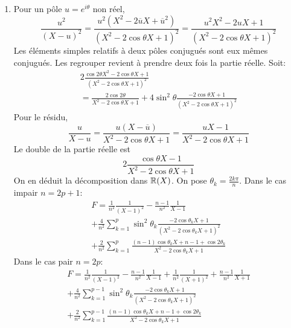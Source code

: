 \begin{enumerate}
\begin{enumerate}
 \item Pour un pôle $u=e^{i\theta}$ non réel, 
\begin{displaymath}
 \frac{u^2}{(X-u)^2}= \frac{u^2(X^2-2\overline{u}X+\overline{u}^2)}{(X^2-2\cos\theta X +1)^2}
=\frac{u^2X^2-2uX+1}{(X^2-2\cos\theta X +1)^2}
\end{displaymath}
Les éléments simples relatifs à deux pôles conjugués sont eux mêmes conjugués. Les regrouper revient à prendre deux fois la partie réelle. Soit:
\begin{multline*}
 2\frac{\cos2\theta X^2 -2\cos\theta X +1}{(X^2-2\cos\theta X +1)^2}\\
= \frac{2\cos 2\theta }{X^2-2\cos\theta X +1} +4\sin^2\theta\frac{-2\cos \theta X +1}{(X^2-2\cos\theta X +1)^2}
\end{multline*}
Pour le résidu,
\begin{displaymath}
 \frac{u}{X-u}=\frac{u(X-\overline{u})}{X^2-2\cos\theta X +1}=\frac{uX-1}{X^2-2\cos\theta X +1}
\end{displaymath}
Le double de la partie réelle est 
\begin{displaymath}
 2\frac{\cos \theta X-1}{X^2-2\cos\theta X +1}
\end{displaymath}
On en déduit la décomposition dans $\mathbb{R}(X)$. On pose $\theta_k= \frac{2k\pi}{n}$.\newline
Dans le cas impair $n=2p+1$:
\begin{multline*}
 F=\frac{1}{n^2}\frac{1}{(X-1)^2}-\frac{n-1}{n^2}\frac{1}{X-1}\\
+\frac{4}{n^2}\sum_{k=1}^p\sin^2\theta_k\frac{-2\cos \theta_k X +1}{(X^2-2\cos\theta_k X +1)^2}\\
+\frac{2}{n^2}\sum_{k=1}^p\frac{(n-1)\cos \theta_k X +n-1+\cos 2\theta_k}{X^2-2\cos\theta_k X +1}
\end{multline*}
Dans le cas pair $n=2p$:
\begin{multline*}
 F=\frac{1}{n^2}\frac{1}{(X-1)^2}-\frac{n-1}{n^2}\frac{1}{X-1}
+\frac{1}{n^2}\frac{1}{(X+1)^2}+\frac{n-1}{n^2}\frac{1}{X+1}\\
+\frac{4}{n^2}\sum_{k=1}^{p-1}\sin^2\theta_k\frac{-2\cos \theta_k X +1}{(X^2-2\cos\theta_k X +1)^2}\\
+\frac{2}{n^2}\sum_{k=1}^{p-1}\frac{(n-1)\cos \theta_k X +n-1+\cos 2\theta_k}{X^2-2\cos\theta_k X +1}
\end{multline*}
\end{enumerate}

\end{enumerate}
